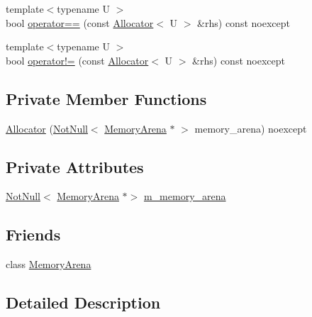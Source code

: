 \begin{DoxyCompactItemize}
\item 
{\footnotesize template$<$typename U $>$ }\\bool \mbox{\hyperlink{classmage_1_1_memory_arena_1_1_allocator_af5dbd3bc4fd2c724000c4c18d1859757}{operator==}} (const \mbox{\hyperlink{classmage_1_1_memory_arena_1_1_allocator}{Allocator}}$<$ U $>$ \&rhs) const noexcept
\item 
{\footnotesize template$<$typename U $>$ }\\bool \mbox{\hyperlink{classmage_1_1_memory_arena_1_1_allocator_aea94739d8bba2c0a77537c776b6789cc}{operator!=}} (const \mbox{\hyperlink{classmage_1_1_memory_arena_1_1_allocator}{Allocator}}$<$ U $>$ \&rhs) const noexcept
\end{DoxyCompactItemize}
\subsection*{Private Member Functions}
\begin{DoxyCompactItemize}
\item 
\mbox{\hyperlink{classmage_1_1_memory_arena_1_1_allocator_a2b2b5fbc4b5552c88ee35e3c093a9468}{Allocator}} (\mbox{\hyperlink{namespacemage_a8769f9d670d6b585ea306cb1062af94b}{Not\+Null}}$<$ \mbox{\hyperlink{classmage_1_1_memory_arena}{Memory\+Arena}} $\ast$ $>$ memory\+\_\+arena) noexcept
\end{DoxyCompactItemize}
\subsection*{Private Attributes}
\begin{DoxyCompactItemize}
\item 
\mbox{\hyperlink{namespacemage_a8769f9d670d6b585ea306cb1062af94b}{Not\+Null}}$<$ \mbox{\hyperlink{classmage_1_1_memory_arena}{Memory\+Arena}} $\ast$$>$ \mbox{\hyperlink{classmage_1_1_memory_arena_1_1_allocator_a1243d2e182ee1001514cc0b50180b959}{m\+\_\+memory\+\_\+arena}}
\end{DoxyCompactItemize}
\subsection*{Friends}
\begin{DoxyCompactItemize}
\item 
class \mbox{\hyperlink{classmage_1_1_memory_arena_1_1_allocator_a934e79307a45b6e72da26d1f10079550}{Memory\+Arena}}
\end{DoxyCompactItemize}


\subsection{Detailed Description}
